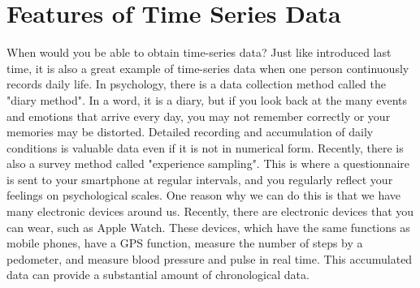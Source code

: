 \documentclass{ltjsbook}
\begin{document}
\section{Features of Time Series Data}
When would you be able to obtain time-series data? Just like introduced last time, it is also a great example of time-series data when one person continuously records daily life.
In psychology, there is a data collection method called the "diary method". In a word, it is a diary, but if you look back at the many events and emotions that arrive every day, you may not remember correctly or your memories may be distorted. Detailed recording and accumulation of daily conditions is valuable data even if it is not in numerical form. Recently, there is also a survey method called "experience sampling". This is where a questionnaire is sent to your smartphone at regular intervals, and you regularly reflect your feelings on psychological scales. One reason why we can do this is that we have many electronic devices around us. Recently, there are electronic devices that you can wear, such as Apple Watch. These devices, which have the same functions as mobile phones, have a GPS function, measure the number of steps by a pedometer, and measure blood pressure and pulse in real time. This accumulated data can provide a substantial amount of chronological data.
\end{document}
